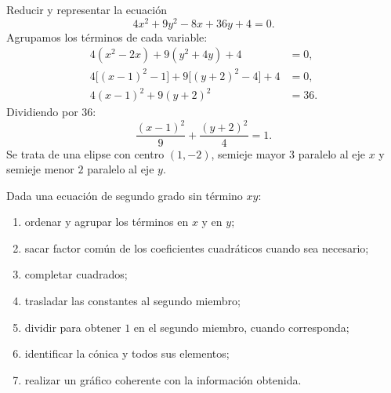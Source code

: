 \documentclass[11pt]{article}
\begin{document}
\begin{mdframed}[style=EjerSty,frametitle={Ejemplo resuelto: reducción a forma ordinaria}]
Reducir y representar la ecuación
\[
4x^2+9y^2-8x+36y+4=0.
\]
Agrupamos los términos de cada variable:
\begin{align*}
4(x^2-2x)+9(y^2+4y)+4&=0,\\
4\big[(x-1)^2-1\big]+9\big[(y+2)^2-4\big]+4&=0,\\
4(x-1)^2+9(y+2)^2&=36.
\end{align*}
Dividiendo por $36$:
\[
\boxed{\frac{(x-1)^2}{9}+\frac{(y+2)^2}{4}=1.}
\]
Se trata de una elipse con centro $(1,-2)$, semieje mayor $3$ paralelo al eje $x$ y semieje menor $2$ paralelo al eje $y$.


\begin{center}
\end{center}
\end{mdframed}

\begin{mdframed}[style=teoSty,frametitle={Procedimiento general de análisis}]
Dada una ecuación de segundo grado sin término $xy$:
\begin{enumerate}
    \item ordenar y agrupar los términos en $x$ y en $y$;
    \item sacar factor común de los coeficientes cuadráticos cuando sea necesario;
    \item completar cuadrados;
    \item trasladar las constantes al segundo miembro;
    \item dividir para obtener $1$ en el segundo miembro, cuando corresponda;
    \item identificar la cónica y todos sus elementos;
    \item realizar un gráfico coherente con la información obtenida.
\end{enumerate}
\end{mdframed}
\end{document}
